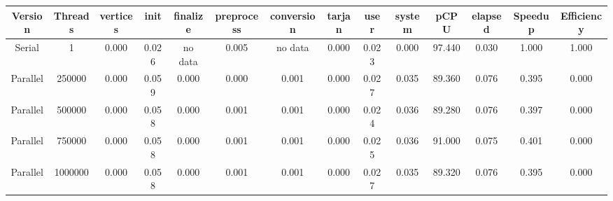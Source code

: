\begin{tabular}{|c|c|c|c|c|c|c|c|c|c|c|c|c|c|}
\toprule
 Version &  Threads &  vertices &  init & finalize &  preprocess & conversion &  tarjan &  user &  system &   pCPU &  elapsed &  Speedup &  Efficiency \\
\midrule
  Serial &        1 &  0.000 & 0.026 &  no data &       0.005 &    no data &   0.000 & 0.023 &   0.000 & 97.440 &    0.030 &    1.000 &       1.000 \\
Parallel &   250000 &  0.000 & 0.059 &    0.000 &       0.000 &      0.001 &   0.000 & 0.027 &   0.035 & 89.360 &    0.076 &    0.395 &       0.000 \\
Parallel &   500000 &  0.000 & 0.058 &    0.000 &       0.001 &      0.001 &   0.000 & 0.024 &   0.036 & 89.280 &    0.076 &    0.397 &       0.000 \\
Parallel &   750000 &  0.000 & 0.058 &    0.000 &       0.001 &      0.001 &   0.000 & 0.025 &   0.036 & 91.000 &    0.075 &    0.401 &       0.000 \\
Parallel &  1000000 &  0.000 & 0.058 &    0.000 &       0.001 &      0.001 &   0.000 & 0.027 &   0.035 & 89.320 &    0.076 &    0.395 &       0.000 \\
\bottomrule
\end{tabular}
